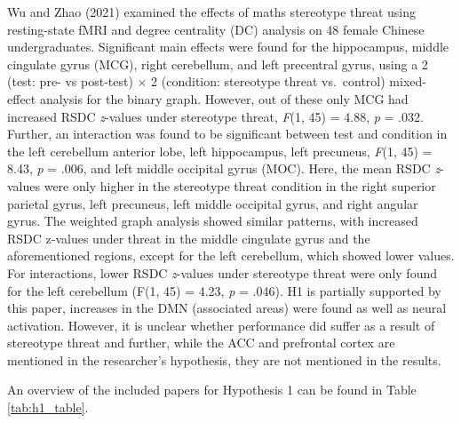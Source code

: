 \documentclass[
  stu, a4paper, 12pt,mask,floatsintext]{apa7}
\begin{document}
Wu and Zhao (2021) examined the effects of maths stereotype threat using resting-state fMRI and degree centrality (DC) analysis on 48 female Chinese undergraduates.
Significant main effects were found for the hippocampus, middle cingulate gyrus (MCG), right cerebellum, and left precentral gyrus, using a 2 (test: pre- vs post-test) \(\times\) 2 (condition: stereotype threat vs.~control) mixed-effect analysis for the binary graph.
However, out of these only MCG had increased RSDC \emph{z}-values under stereotype threat, \emph{F}(1, 45) = 4.88, \emph{p} = .032.
Further, an interaction was found to be significant between test and condition in the left cerebellum anterior lobe, left hippocampus, left precuneus, \emph{F}(1, 45) = 8.43, \emph{p} = .006, and left middle occipital gyrus (MOC).
Here, the mean RSDC \emph{z}-values were only higher in the stereotype threat condition in the right superior parietal gyrus, left precuneus, left middle occipital gyrus, and right angular gyrus.
The weighted graph analysis showed similar patterns, with increased RSDC z-values under threat in the middle cingulate gyrus and the aforementioned regions, except for the left cerebellum, which showed lower values.
For interactions, lower RSDC \emph{z}-values under stereotype threat were only found for the left cerebellum (F(1, 45) = 4.23, \emph{p} = .046).
H1 is partially supported by this paper, increases in the DMN (associated areas) were found as well as neural activation. However, it is unclear whether performance did suffer as a result of stereotype threat and further, while the ACC and prefrontal cortex are mentioned in the researcher's hypothesis, they are not mentioned in the results.

An overview of the included papers for Hypothesis 1 can be found in Table \ref{tab:h1_table}.
\end{document}
